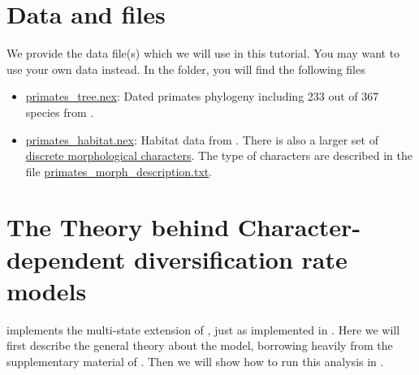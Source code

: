 \section{Data and files}

We provide the data file(s) which we will use in this tutorial.
You may want to use your own data instead.
In the  folder, you will find the following files
\begin{itemize}
\item \href{https://github.com/revbayes/revbayes_tutorial/raw/master/RB_DiversificationRate_CharacterDependent_Tutorial/data/primates\_tree.nex}{primates\_tree.nex}: Dated primates phylogeny including 233 out of 367 species from \cite{MagnusonFord2012}.
\item \href{https://github.com/revbayes/revbayes_tutorial/raw/master/RB_DiversificationRate_CharacterDependent_Tutorial/data/primates_habitat.nex}{primates\_habitat.nex}: Habitat data from \cite{MagnusonFord2012}. There is also a larger set of \href{https://github.com/revbayes/revbayes_tutorial/raw/master/RB_DiversificationRate_CharacterDependent_Tutorial/data/primates_morph.nex}{discrete morphological characters}. The type of characters are described in the file \href{https://github.com/revbayes/revbayes_tutorial/raw/master/RB_DiversificationRate_CharacterDependent_Tutorial/data/primates_morph_description.txt}{primates\_morph\_description.txt}.
\end{itemize}





\bigskip
\section{The Theory behind Character-dependent diversification rate models}\label{sec:BiSSE_Theory}

\RevBayes implements the multi-state extension of \BiSSE, just as implemented in \diversitree. 
Here we will first describe the general theory about the model, borrowing heavily from the supplementary material of \cite{Moore2016}.
Then we will show how to run this analysis in \RevBayes.

